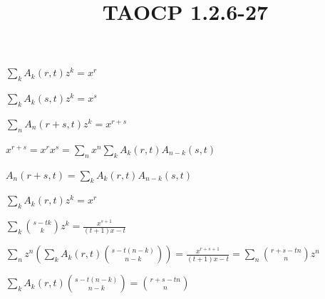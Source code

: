 \documentclass{article}
\title{TAOCP 1.2.6\mbox{-}27}
\begin{document}
\maketitle

\( \sum_{k} A_{k}(r,t)z^{k} = x^{r} \)

\( \sum_{k} A_{k}(s,t)z^{k} = x^{s} \)

\( \sum_{n} A_{n}(r+s,t)z^{k} = x^{r+s} \)

\( x^{r+s} = x^{r} x^{s} = \sum_{n} x^{n} \sum_{k} A_{k}(r,t)A_{n-k}(s,t) \)

\( A_{n}(r+s,t) = \sum_{k} A_{k}(r,t)A_{n-k}(s,t) \)

\( \sum_{k} A_{k}(r,t)z^{k} = x^{r} \)

\( \sum_{k} \binom{s-tk}{k}z^{k} = \frac{x^{s+1}}{(t+1)x-t} \)

\( \sum_{n} z^{n} (\sum_{k} A_{k}(r,t) \binom{s-t(n-k)}{n-k}) = \frac{x^{r+s+1}}{(t+1)x - t} = \sum_{n}\binom{r+s-tn}{n}z^{n} \)

\( \sum_{k} A_{k}(r,t) \binom{s-t(n-k)}{n-k} = \binom{r+s-tn}{n} \)
\end{document}
